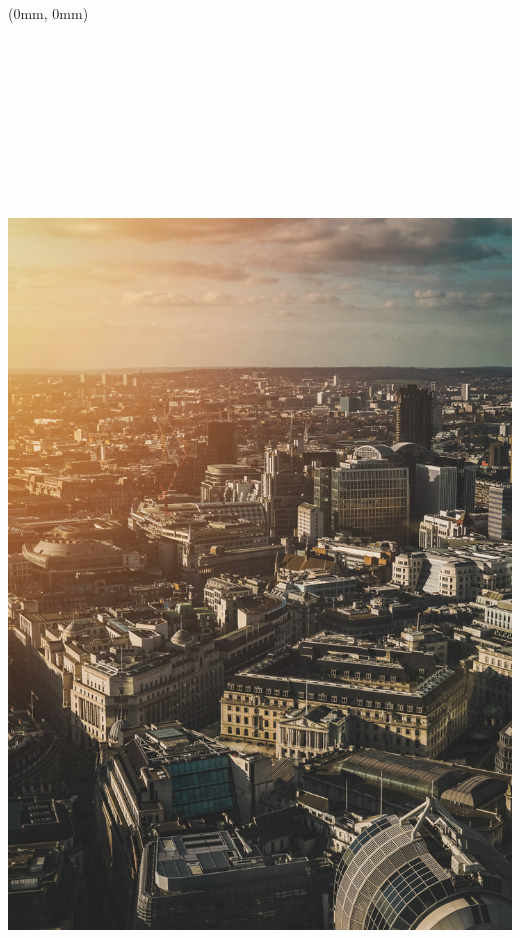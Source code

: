 \documentclass[
  a4paper,
  twoside, 11pt]{article}
\author{}
\date{\vspace{-2.5em}}
\begin{document}
\frenchspacing

\raggedright

\raggedbottom

\begin{textblock*}{21cm}(0mm, 0mm)
\includegraphics[width=21cm,height=29.7cm]{cover_image_2020_q4.jpg}
\end{textblock*}
\end{document}
